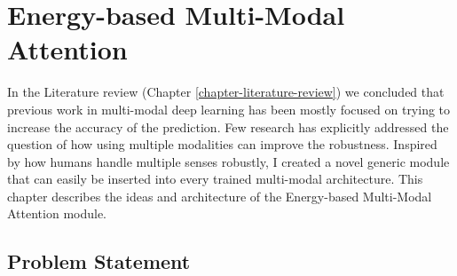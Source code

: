 \chapter{Energy-based Multi-Modal Attention} 
\label{chapter-emma} 

In the Literature review (Chapter \ref{chapter-literature-review}) we concluded that previous work in multi-modal deep learning has been mostly focused on trying to increase the accuracy of the prediction. Few research has explicitly addressed the question of how using multiple modalities can improve the robustness. Inspired by how humans handle multiple senses robustly, I created a novel generic module that can easily be inserted into every trained multi-modal architecture. This chapter describes the ideas and architecture of the Energy-based Multi-Modal Attention module.


\section{Problem Statement}\label{sec:prob-statement}

